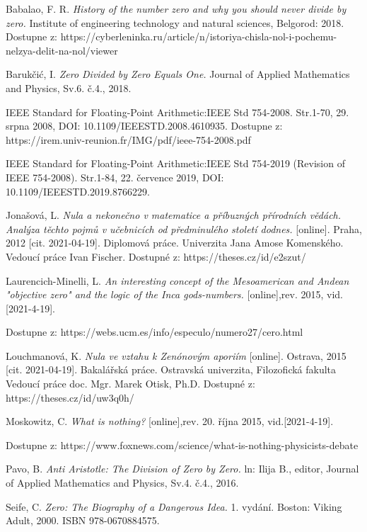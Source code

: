 \documentclass[a4paper, 11pt]{article}
\begin{document}
	\begin{thebibliography}{9}
        Babalao, F. R. \textit{History of the number zero and why you should never divide by zero.} Institute of engineering technology and natural sciences, Belgorod: 2018.
        Dostupne z: https://cyberleninka.ru/article/n/istoriya-chisla-nol-i-pochemu-nelzya-delit-na-nol/viewer
        
        Barukčić, I. \textit{ Zero Divided by Zero Equals One.} Journal of Applied Mathematics and Physics, Sv.6. č.4., 2018.
        
        IEEE Standard for Floating-Point Arithmetic:IEEE Std 754-2008. Str.1-70, 29. srpna 2008, DOI: 10.1109/IEEESTD.2008.4610935.
        Dostupne z: https://irem.univ-reunion.fr/IMG/pdf/ieee-754-2008.pdf
        
        IEEE Standard for Floating-Point Arithmetic:IEEE Std 754-2019 (Revision of IEEE 754-2008). Str.1-84, 22. července 2019, DOI: 10.1109/IEEESTD.2019.8766229.
        
        Jonašová, L. \textit{Nula a nekonečno v matematice a příbuzných přírodních vědách. Analýza těchto pojmů v učebnicích od předminulého století dodnes.} [online]. Praha, 2012 [cit. 2021-04-19]. Diplomová práce. Univerzita Jana Amose Komenského. Vedoucí práce Ivan Fischer.
        Dostupné z: https://theses.cz/id/e2szut/
        
        Laurencich-Minelli, L. \textit{An interesting concept of the Mesoamerican and Andean "objective zero" and the logic of the Inca gods-numbers.}  [online],rev. 2015, vid.[2021-4-19].
        
        Dostupne z: https://webs.ucm.es/info/especulo/numero27/cero.html
        
        Louchmanová, K. \textit{Nula ve vztahu k Zenónovým aporiím} [online]. Ostrava, 2015 [cit. 2021-04-19]. Bakalářská práce. Ostravská univerzita, Filozofická fakulta Vedoucí práce doc. Mgr. Marek Otisk, Ph.D. 
        Dostupné z: https://theses.cz/id/uw3q0h/

        Moskowitz, C. \textit{What is nothing?}  [online],rev. 20. října 2015, vid.[2021-4-19].

        Dostupne z: https://www.foxnews.com/science/what-is-nothing-physicists-debate
        
        Pavo, B. \textit{Anti Aristotle: The Division of Zero by Zero.}  ln: Ilija B., editor, Journal of Applied Mathematics and Physics, Sv.4. č.4., 2016.
        
        Seife, C. \textit{Zero: The Biography of a Dangerous Idea.}  1. vydání. Boston: Viking Adult, 2000. ISBN 978-0670884575.
    \end{thebibliography}
\end{document}
